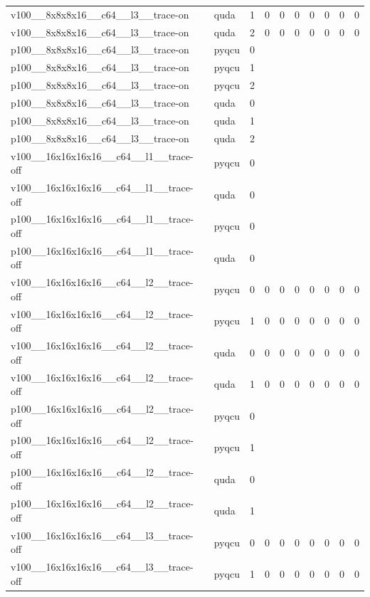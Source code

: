 \begin{table}[htbp]
\begin{tabular}{@{}llrrrrrrrr@{}}
v100\_\_8x8x8x16\_\_c64\_\_l3\_\_trace-on & quda & 1 & 0 & 0 & 0 & 0 & 0 & 0 & 0 \\
v100\_\_8x8x8x16\_\_c64\_\_l3\_\_trace-on & quda & 2 & 0 & 0 & 0 & 0 & 0 & 0 & 0 \\
p100\_\_8x8x8x16\_\_c64\_\_l3\_\_trace-on & pyqcu & 0 &  &  &  &  &  &  &  \\
p100\_\_8x8x8x16\_\_c64\_\_l3\_\_trace-on & pyqcu & 1 &  &  &  &  &  &  &  \\
p100\_\_8x8x8x16\_\_c64\_\_l3\_\_trace-on & pyqcu & 2 &  &  &  &  &  &  &  \\
p100\_\_8x8x8x16\_\_c64\_\_l3\_\_trace-on & quda & 0 &  &  &  &  &  &  &  \\
p100\_\_8x8x8x16\_\_c64\_\_l3\_\_trace-on & quda & 1 &  &  &  &  &  &  &  \\
p100\_\_8x8x8x16\_\_c64\_\_l3\_\_trace-on & quda & 2 &  &  &  &  &  &  &  \\
v100\_\_16x16x16x16\_\_c64\_\_l1\_\_trace-off & pyqcu & 0 &  &  &  &  &  &  &  \\
v100\_\_16x16x16x16\_\_c64\_\_l1\_\_trace-off & quda & 0 &  &  &  &  &  &  &  \\
p100\_\_16x16x16x16\_\_c64\_\_l1\_\_trace-off & pyqcu & 0 &  &  &  &  &  &  &  \\
p100\_\_16x16x16x16\_\_c64\_\_l1\_\_trace-off & quda & 0 &  &  &  &  &  &  &  \\
v100\_\_16x16x16x16\_\_c64\_\_l2\_\_trace-off & pyqcu & 0 & 0 & 0 & 0 & 0 & 0 & 0 & 0 \\
v100\_\_16x16x16x16\_\_c64\_\_l2\_\_trace-off & pyqcu & 1 & 0 & 0 & 0 & 0 & 0 & 0 & 0 \\
v100\_\_16x16x16x16\_\_c64\_\_l2\_\_trace-off & quda & 0 & 0 & 0 & 0 & 0 & 0 & 0 & 0 \\
v100\_\_16x16x16x16\_\_c64\_\_l2\_\_trace-off & quda & 1 & 0 & 0 & 0 & 0 & 0 & 0 & 0 \\
p100\_\_16x16x16x16\_\_c64\_\_l2\_\_trace-off & pyqcu & 0 &  &  &  &  &  &  &  \\
p100\_\_16x16x16x16\_\_c64\_\_l2\_\_trace-off & pyqcu & 1 &  &  &  &  &  &  &  \\
p100\_\_16x16x16x16\_\_c64\_\_l2\_\_trace-off & quda & 0 &  &  &  &  &  &  &  \\
p100\_\_16x16x16x16\_\_c64\_\_l2\_\_trace-off & quda & 1 &  &  &  &  &  &  &  \\
v100\_\_16x16x16x16\_\_c64\_\_l3\_\_trace-off & pyqcu & 0 & 0 & 0 & 0 & 0 & 0 & 0 & 0 \\
v100\_\_16x16x16x16\_\_c64\_\_l3\_\_trace-off & pyqcu & 1 & 0 & 0 & 0 & 0 & 0 & 0 & 0 \\

\end{tabular}
\end{table}
